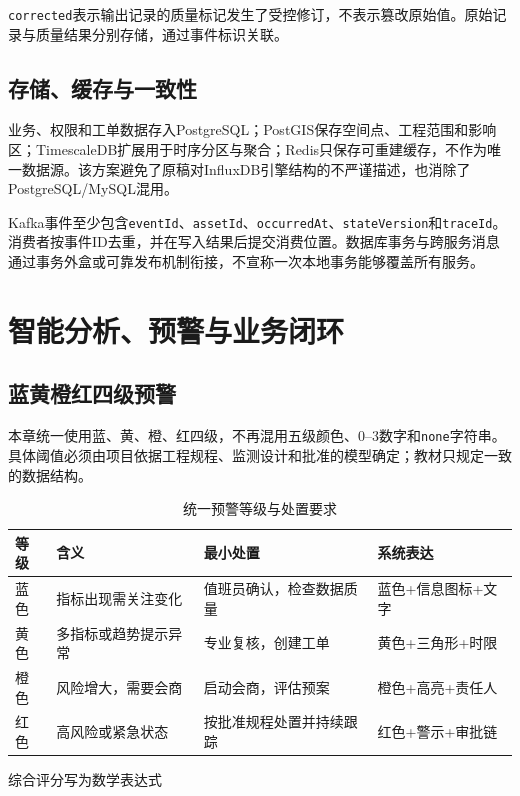 \texttt{corrected}表示输出记录的质量标记发生了受控修订，不表示篡改原始值。原始记录与质量结果分别存储，通过事件标识关联。

\subsection{存储、缓存与一致性}

业务、权限和工单数据存入PostgreSQL；PostGIS保存空间点、工程范围和影响区；TimescaleDB扩展用于时序分区与聚合；Redis只保存可重建缓存，不作为唯一数据源。该方案避免了原稿对InfluxDB引擎结构的不严谨描述，也消除了PostgreSQL/MySQL混用。

Kafka事件至少包含\texttt{eventId}、\texttt{assetId}、\texttt{occurredAt}、\texttt{stateVersion}和\texttt{traceId}。消费者按事件ID去重，并在写入结果后提交消费位置。数据库事务与跨服务消息通过事务外盒或可靠发布机制衔接，不宣称一次本地事务能够覆盖所有服务。

\section{智能分析、预警与业务闭环}

\subsection{蓝黄橙红四级预警}

本章统一使用蓝、黄、橙、红四级，不再混用五级颜色、0--3数字和\texttt{none}字符串。具体阈值必须由项目依据工程规程、监测设计和批准的模型确定；教材只规定一致的数据结构。

\begin{table}[htbp]
\centering
\caption{统一预警等级与处置要求}
\label{tab:warning-levels}
\begin{tabular}{p{1.8cm}p{3.7cm}p{4.3cm}p{3.1cm}}
\toprule
等级 & 含义 & 最小处置 & 系统表达 \\
\midrule
蓝色 & 指标出现需关注变化 & 值班员确认，检查数据质量 & 蓝色+信息图标+文字 \\
黄色 & 多指标或趋势提示异常 & 专业复核，创建工单 & 黄色+三角形+时限 \\
橙色 & 风险增大，需要会商 & 启动会商，评估预案 & 橙色+高亮+责任人 \\
红色 & 高风险或紧急状态 & 按批准规程处置并持续跟踪 & 红色+警示+审批链 \\
\bottomrule
\end{tabular}
\end{table}

综合评分写为数学表达式

